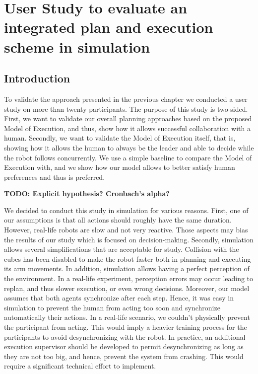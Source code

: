 \ifdefined{}
\else
\setcounter{chapter}{4} 
\dominitoc
\faketableofcontents
\fi

\chapter{User Study to evaluate an integrated plan and execution scheme in simulation}
\label{chap:5}
\minitoc

\section{Introduction}

To validate the approach presented in the previous chapter we conducted a user study on more than twenty participants. The purpose of this study is two-sided. 
First, we want to validate our overall planning approaches based on the proposed Model of Execution, and thus, show how it allows successful collaboration with a human. 
Secondly, we want to validate the Model of Execution itself, that is, showing how it allows the human to always be the leader and able to decide while the robot follows concurrently. We use a simple baseline to compare the Model of Execution with, and we show how our model allows to better satisfy human preferences and thus is preferred. 

\textbf{TODO: Explicit hypothesis? Cronbach’s alpha?}

We decided to conduct this study in simulation for various reasons. First, one of our assumptions is that all actions should roughly have the same duration. However, real-life robots are slow and not very reactive. Those aspects may bias the results of our study which is focused on decision-making. Secondly, simulation allows several simplifications that are acceptable for study. Collision with the cubes has been disabled to make the robot faster both in planning and executing its arm movements. In addition, simulation allows having a perfect perception of the environment. In a real-life experiment, perception errors may occur leading to replan, and thus slower execution, or even wrong decisions. Moreover, our model assumes that both agents synchronize after each step. Hence, it was easy in simulation to prevent the human from acting too soon and synchronize automatically their actions. In a real-life scenario, we couldn't physically prevent the participant from acting. This would imply a heavier training process for the participants to avoid desynchronizing with the robot. In practice, an additional execution supervisor should be developed to permit desynchronizing as long as they are not too big, and hence, prevent the system from crashing. This would require a significant technical effort to implement.

